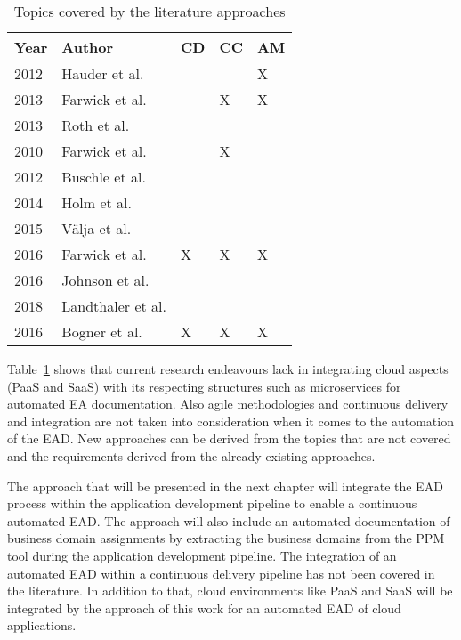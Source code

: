 \begin{table}[htpb]
  \caption[Topics covered by the literature approaches]{Topics covered by the literature approaches}\label{tab:literature-summary}
  \centering
  \begin{tabular}{l l l l l}
    \toprule
      Year & Author & CD & CC & AM\\
    \midrule
      2012 & Hauder et al. &   &   & X\\
      2013 & Farwick et al. &   & X & X\\
      2013 & Roth et al. &   &   &  \\
      2010 & Farwick et al. &   & X &  \\
      2012 & Buschle et al. &   &   &  \\
      2014 & Holm et al. &   &   &  \\
      2015 & Välja et al. &   &   &  \\
      2016 & Farwick et al. & X & X & X\\
      2016 & Johnson et al. &   &   &  \\
      2018 & Landthaler et al. &   &   &  \\
      2016 & Bogner et al. & X & X & X\\
    \bottomrule
  \end{tabular}
\end{table}

Table~\ref{tab:literature-summary} shows that current research endeavours lack in integrating cloud aspects (PaaS and SaaS) with its respecting structures such as microservices for automated EA documentation. \cite{Buschle2012} Also agile methodologies and continuous delivery and integration are not taken into consideration when it comes to the automation of the EAD. New approaches can be derived from the topics that are not covered and the requirements derived from the already existing approaches.

The approach that will be presented in the next chapter will integrate the EAD process within the application development pipeline to enable a continuous automated EAD. The approach will also include an automated documentation of business domain assignments by extracting the business domains from the PPM tool during the application development pipeline.
The integration of an automated EAD within a continuous delivery pipeline has not been covered in the literature. In addition to that, cloud environments like PaaS and SaaS will be integrated by the approach of this work for an automated EAD of cloud applications.


